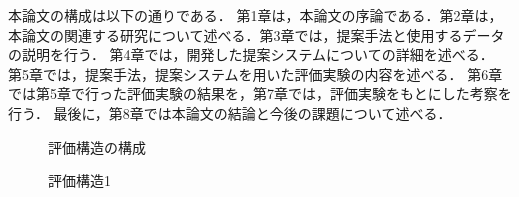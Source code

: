 \documentclass[syuuron]{kuee}
\begin{document}
	本論文の構成は以下の通りである．
	第1章は，本論文の序論である．第2章は，本論文の関連する研究について述べる．第3章では，提案手法と使用するデータの説明を行う．
	第4章では，開発した提案システムについての詳細を述べる．
	第5章では，提案手法，提案システムを用いた評価実験の内容を述べる．
	第6章では第5章で行った評価実験の結果を，第7章では，評価実験をもとにした考察を行う．
	最後に，第8章では本論文の結論と今後の課題について述べる．

		\begin{figure}
			\begin{center}
			\end{center}
			\caption{評価構造の構成}
	  		\label{fig:es1}
		\end{figure}
		\begin{figure}
			\begin{center}
			\end{center}
			\caption{評価構造1}
	  		\label{fig:es2}
		\end{figure}
\end{document}
